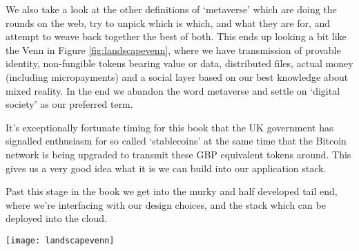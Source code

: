 We also take a look at the other definitions of `metaverse' which are doing the rounds on the web, try to unpick which is which, and what they are for, and attempt to weave back together the best of both. This ends up looking a bit like the Venn in Figure \ref{fig:landscapevenn}, where we have transmission of provable identity, non-fungible tokens bearing value or data, distributed files, actual money (including micropayments) and a social layer based on our best knowledge about mixed reality. In the end we abandon the word metaverse and settle on `digital society' as our preferred term.\par
It's exceptionally fortunate timing for this book that the UK government has signalled enthusiasm for so called `stablecoins' at the same time that the Bitcoin network is being upgraded to transmit these GBP equivalent tokens around. This gives us a very good idea what it is we can build into our application stack.\par 
Past this stage in the book we get into the murky and half developed tail end, where we’re interfacing with our design choices, and the stack which can be deployed into the cloud.\par

\begin{figure*}[ht]\centering %
	\texttt{[image: landscapevenn]}
	\caption{Web 3, Metaverse, and Bitcoin are intersectional technologies.}
	\label{fig:landscapevenn}
\end{figure*}

